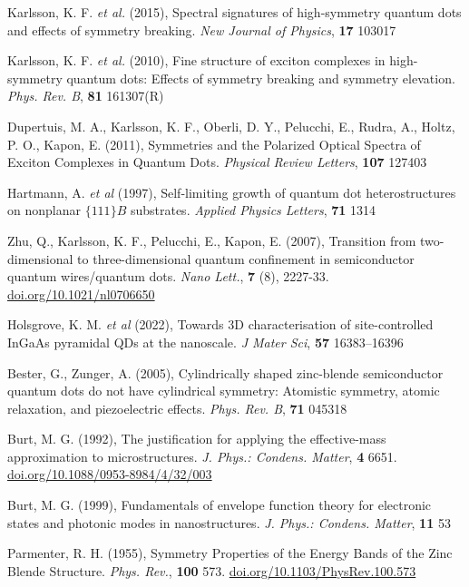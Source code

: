 \documentclass[12pt]{article}
\begin{document}
\begin{thebibliography}{10}
Karlsson, K. F. \textit{et al.} (2015), Spectral signatures of high-symmetry quantum dots and effects of symmetry breaking. \textit{New Journal of Physics}, \textbf{17} 103017

Karlsson, K. F. \textit{et al.} (2010), Fine structure of exciton complexes in high-symmetry quantum dots: Effects of symmetry breaking and symmetry elevation. \textit{Phys. Rev. B}, \textbf{81} 161307(R)

Dupertuis, M. A., Karlsson, K. F., Oberli, D. Y., Pelucchi, E., Rudra, A., Holtz, P. O., Kapon, E. (2011), Symmetries and the Polarized Optical Spectra of Exciton Complexes in Quantum Dots. \textit{Physical Review Letters}, \textbf{107} 127403

Hartmann, A. \textit{et al} (1997), Self-limiting growth of quantum dot heterostructures on nonplanar $\{111\}B$ substrates. \textit{Applied Physics Letters}, \textbf{71} 1314

Zhu, Q., Karlsson, K. F., Pelucchi, E., Kapon, E. (2007), Transition from two-dimensional to three-dimensional quantum confinement in semiconductor quantum wires/quantum dots. \textit{Nano Lett.}, \textbf{7} (8), 2227-33. \href{https://doi.org/10.1021/nl0706650}{doi.org/10.1021/nl0706650}

Holsgrove, K. M. \textit{et al} (2022), Towards 3D characterisation of site-controlled InGaAs pyramidal QDs at the nanoscale. \textit{J Mater Sci}, \textbf{57} 16383--16396

Bester, G., Zunger, A. (2005), Cylindrically shaped zinc-blende semiconductor quantum dots do not have cylindrical symmetry: Atomistic symmetry, atomic relaxation, and piezoelectric effects. \textit{Phys. Rev. B}, \textbf{71} 045318

Burt, M. G. (1992), The justification for applying the effective-mass approximation to microstructures. \textit{J. Phys.: Condens. Matter}, \textbf{4} 6651. \href{https://doi.org/10.1088/0953-8984/4/32/003}{doi.org/10.1088/0953-8984/4/32/003}

Burt, M. G. (1999), Fundamentals of envelope function theory for electronic states and photonic modes in nanostructures. \textit{J. Phys.: Condens. Matter}, \textbf{11} 53

Parmenter, R. H. (1955), Symmetry Properties of the Energy Bands of the Zinc Blende Structure. \textit{Phys. Rev.}, \textbf{100} 573. \href{https://doi.org/10.1103/PhysRev.100.573}{doi.org/10.1103/PhysRev.100.573}


\end{thebibliography}
\end{document}

